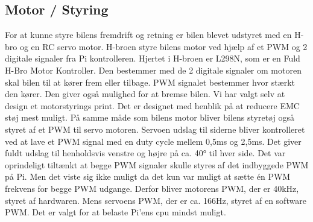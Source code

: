 \subsection{Motor / Styring}

For at kunne styre bilens fremdrift og retning er bilen blevet udstyret med en H-bro og en RC servo motor.
H-broen styre bilens motor ved hjælp af et PWM og 2 digitale signaler fra Pi kontrolleren. Hjertet i H-broen er L298N\cite{L298N_datablad}, som er en Fuld H-Bro Motor Kontroller. Den bestemmer med de 2 digitale signaler om motoren skal bilen til at kører frem eller tilbage. PWM signalet bestemmer hvor stærkt den kører. Den giver også mulighed for at bremse bilen. Vi har valgt selv at design et motorstyrings print. Det er designet med henblik på at reducere EMC støj mest muligt.
På samme måde som bilens motor bliver bilens styretøj også styret af et PWM til servo motoren. Servoen udslag til siderne bliver kontrolleret ved at lave et PWM signal med en duty cycle mellem 0,5ms og 2,5ms. Det giver fuldt udslag til henholdsvis venstre og højre på ca. 40\si{\degree} til hver side.
Det var oprindeligt tiltænkt at begge PWM signaler skulle styres af det indbyggede PWM på Pi. Men det viste sig ikke muligt da det kun var muligt at sætte én PWM frekvens for begge PWM udgange. Derfor bliver motorens PWM, der er 40kHz, styret af hardwaren. Mens servoens PWM, der er ca. 166Hz, styret af en software PWM. Det er valgt for at belaste Pi'ens cpu mindst muligt.